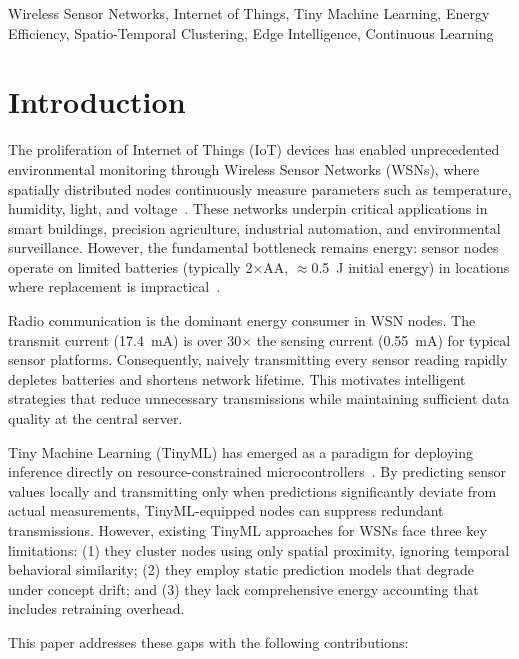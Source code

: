 \documentclass[conference]{IEEEtran}
\begin{document}
\begin{IEEEkeywords}
Wireless Sensor Networks, Internet of Things, Tiny Machine Learning, Energy Efficiency, Spatio-Temporal Clustering, Edge Intelligence, Continuous Learning
\end{IEEEkeywords}

\section{Introduction}

The proliferation of Internet of Things (IoT) devices has enabled unprecedented environmental monitoring through Wireless Sensor Networks (WSNs), where spatially distributed nodes continuously measure parameters such as temperature, humidity, light, and voltage~\cite{Ahmed2023WSNEnergy}. These networks underpin critical applications in smart buildings, precision agriculture, industrial automation, and environmental surveillance. However, the fundamental bottleneck remains energy: sensor nodes operate on limited batteries (typically 2$\times$AA, $\approx$0.5~J initial energy) in locations where replacement is impractical~\cite{Sharma2024ClusteringWSN}.

Radio communication is the dominant energy consumer in WSN nodes. The transmit current (17.4~mA) is over 30$\times$ the sensing current (0.55~mA) for typical sensor platforms. Consequently, naively transmitting every sensor reading rapidly depletes batteries and shortens network lifetime. This motivates intelligent strategies that reduce unnecessary transmissions while maintaining sufficient data quality at the central server.

Tiny Machine Learning (TinyML) has emerged as a paradigm for deploying inference directly on resource-constrained microcontrollers~\cite{Ray2022TinyMLDeployment, Sakr2024TinyMLApplications}. By predicting sensor values locally and transmitting only when predictions significantly deviate from actual measurements, TinyML-equipped nodes can suppress redundant transmissions. However, existing TinyML approaches for WSNs face three key limitations: (1) they cluster nodes using only spatial proximity, ignoring temporal behavioral similarity; (2) they employ static prediction models that degrade under concept drift; and (3) they lack comprehensive energy accounting that includes retraining overhead.

This paper addresses these gaps with the following contributions:
\end{document}
